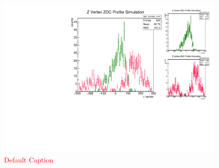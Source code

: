 \begin{figure}
\begin{center}
\includegraphics[width=\linewidth,height=\textheight,keepaspectratio]{../HourglassCorrection/figs/z_profile_scale}
\caption{ \textcolor{red}{Default Caption} }
\label{fig:z_profile_scale}
\end{center}
\end{figure}